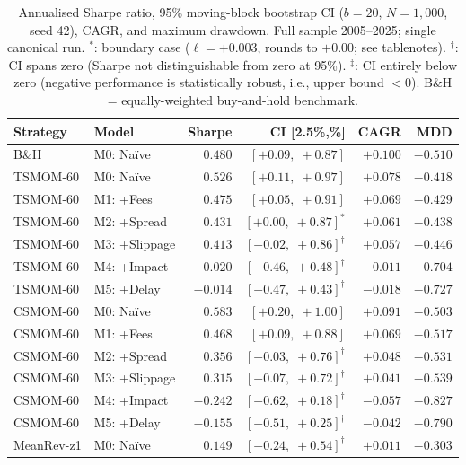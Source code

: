 \documentclass[12pt]{article}
\begin{document}
\begin{table}[H]
\centering
\caption{Annualised Sharpe ratio, 95\% moving-block bootstrap CI
($b = 20$, $N = 1{,}000$, seed 42), CAGR, and maximum drawdown.
Full sample 2005--2025; single canonical run.
$^*$: boundary case ($\ell = +0.003$, rounds to $+0.00$; see tablenotes).
$^\dagger$: CI spans zero (Sharpe not distinguishable from zero at 95\%).
$^\ddagger$: CI entirely below zero (negative performance is statistically
robust, i.e., upper bound $< 0$).
B\&H = equally-weighted buy-and-hold benchmark.}
\label{tab:master}
\small
\setlength{\tabcolsep}{4pt}
\begin{tabular}{llrrrr}
\toprule
Strategy & Model & Sharpe & CI [2.5\%,\;97.5\%] & CAGR & MDD \\
\midrule
B\&H       & M0: Na\"{i}ve   & $0.480$ & $[+0.09,\;+0.87]$ & $+0.100$ & $-0.510$ \\
\midrule
TSMOM-60   & M0: Na\"{i}ve   & $0.526$ & $[+0.11,\;+0.97]$ & $+0.078$ & $-0.418$ \\
TSMOM-60   & M1: +Fees       & $0.475$ & $[+0.05,\;+0.91]$ & $+0.069$ & $-0.429$ \\
TSMOM-60   & M2: +Spread     & $0.431$ & $[+0.00,\;+0.87]^*$       & $+0.061$ & $-0.438$ \\
TSMOM-60   & M3: +Slippage   & $0.413$ & $[-0.02,\;+0.86]^\dagger$ & $+0.057$ & $-0.446$ \\
TSMOM-60   & M4: +Impact     & $0.020$ & $[-0.46,\;+0.48]^\dagger$ & $-0.011$ & $-0.704$ \\
TSMOM-60   & M5: +Delay      & $-0.014$ & $[-0.47,\;+0.43]^\dagger$ & $-0.018$ & $-0.727$ \\
\midrule
CSMOM-60   & M0: Na\"{i}ve   & $0.583$ & $[+0.20,\;+1.00]$         & $+0.091$ & $-0.503$ \\
CSMOM-60   & M1: +Fees       & $0.468$ & $[+0.09,\;+0.88]$         & $+0.069$ & $-0.517$ \\
CSMOM-60   & M2: +Spread     & $0.356$ & $[-0.03,\;+0.76]^\dagger$ & $+0.048$ & $-0.531$ \\
CSMOM-60   & M3: +Slippage   & $0.315$ & $[-0.07,\;+0.72]^\dagger$ & $+0.041$ & $-0.539$ \\
CSMOM-60   & M4: +Impact     & $-0.242$ & $[-0.62,\;+0.18]^\dagger$ & $-0.057$ & $-0.827$ \\
CSMOM-60   & M5: +Delay      & $-0.155$ & $[-0.51,\;+0.25]^\dagger$ & $-0.042$ & $-0.790$ \\
\midrule
MeanRev-z1 & M0: Na\"{i}ve   & $0.149$ & $[-0.24,\;+0.54]^\dagger$ & $+0.011$ & $-0.303$ \\

\end{tabular}
\end{table}
\end{document}

